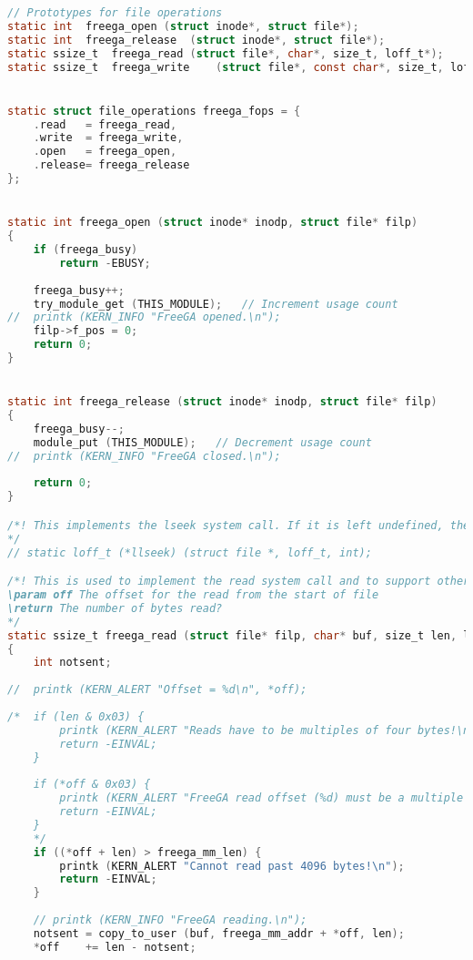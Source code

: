 \begin{lstlisting}[language=C]
// Prototypes for file operations
static int	freega_open	(struct inode*, struct file*);
static int	freega_release	(struct inode*, struct file*);
static ssize_t	freega_read	(struct file*, char*, size_t, loff_t*);
static ssize_t	freega_write	(struct file*, const char*, size_t, loff_t*);


static struct file_operations freega_fops = {
	.read	= freega_read,
	.write	= freega_write,
	.open	= freega_open,
	.release= freega_release
};


static int freega_open (struct inode* inodp, struct file* filp)
{
	if (freega_busy)
		return -EBUSY;
	
	freega_busy++;
	try_module_get (THIS_MODULE);	// Increment usage count
//	printk (KERN_INFO "FreeGA opened.\n");
	filp->f_pos = 0;
	return 0;
}


static int freega_release (struct inode* inodp, struct file* filp)
{
	freega_busy--;
	module_put (THIS_MODULE);	// Decrement usage count
//	printk (KERN_INFO "FreeGA closed.\n");
	
	return 0;
}

/*! This implements the lseek system call. If it is left undefined, then default_llseek from fs/read_write.c is used instead. This updates the f_pos field as expected, and also may change the f_reada field and f_version field.
*/
// static loff_t (*llseek) (struct file *, loff_t, int);

/*! This is used to implement the read system call and to support other occasions for reading files such a loading executables and reading the quotas file. It is expected to update the offset value (last argument) which is usually a pointer to the f_pos field in the file structure, except for the pread and pwrite system calls.
\param off The offset for the read from the start of file
\return The number of bytes read?
*/
static ssize_t freega_read (struct file* filp, char* buf, size_t len, loff_t* off)
{
	int	notsent;
	
//	printk (KERN_ALERT "Offset = %d\n", *off);
	
/*	if (len & 0x03) {
		printk (KERN_ALERT "Reads have to be multiples of four bytes!\n");
		return -EINVAL;
	}
	
	if (*off & 0x03) {
		printk (KERN_ALERT "FreeGA read offset (%d) must be a multiple of four bytes!\n", (int)*off);
		return -EINVAL;
	}
	*/
	if ((*off + len) > freega_mm_len) {
		printk (KERN_ALERT "Cannot read past 4096 bytes!\n");
		return -EINVAL;
	}
	
	// printk (KERN_INFO "FreeGA reading.\n");
	notsent	= copy_to_user (buf, freega_mm_addr + *off, len);
	*off	+= len - notsent;
	

\end{lstlisting}
